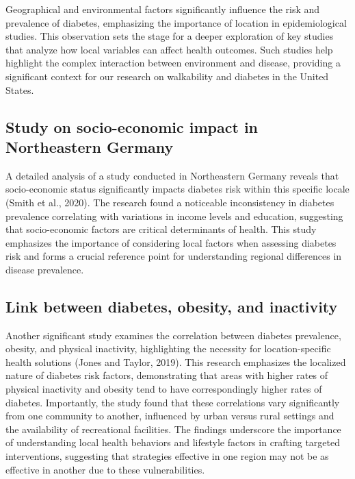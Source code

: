 \documentclass[
]{article}
\begin{document}
Geographical and environmental factors significantly influence the risk
and prevalence of diabetes, emphasizing the importance of location in
epidemiological studies. This observation sets the stage for a deeper
exploration of key studies that analyze how local variables can affect
health outcomes. Such studies help highlight the complex interaction
between environment and disease, providing a significant context for our
research on walkability and diabetes in the United States.

\subsection{Study on socio-economic impact in Northeastern
Germany}\label{study-on-socio-economic-impact-in-northeastern-germany}

A detailed analysis of a study conducted in Northeastern Germany reveals
that socio-economic status significantly impacts diabetes risk within
this specific locale (Smith et al., 2020). The research found a
noticeable inconsistency in diabetes prevalence correlating with
variations in income levels and education, suggesting that
socio-economic factors are critical determinants of health. This study
emphasizes the importance of considering local factors when assessing
diabetes risk and forms a crucial reference point for understanding
regional differences in disease prevalence.

\subsection{Link between diabetes, obesity, and
inactivity}\label{link-between-diabetes-obesity-and-inactivity}

Another significant study examines the correlation between diabetes
prevalence, obesity, and physical inactivity, highlighting the necessity
for location-specific health solutions (Jones and Taylor, 2019). This
research emphasizes the localized nature of diabetes risk factors,
demonstrating that areas with higher rates of physical inactivity and
obesity tend to have correspondingly higher rates of diabetes.
Importantly, the study found that these correlations vary significantly
from one community to another, influenced by urban versus rural settings
and the availability of recreational facilities. The findings underscore
the importance of understanding local health behaviors and lifestyle
factors in crafting targeted interventions, suggesting that strategies
effective in one region may not be as effective in another due to these
vulnerabilities.
\end{document}
